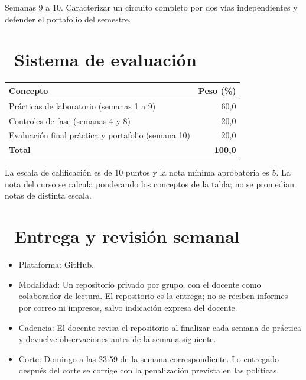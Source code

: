 \documentclass[11pt,a4paper]{article}
\newcommand{\iconotexto}[2]{\textcolor{cyanNeon}{\faIcon{#1}}~#2}
\begin{document}
\begin{tcolorbox}[cajaContenido,title={Fase 3 --- Integración y cierre}]Semanas 9 a 10. Caracterizar un circuito completo por dos vías independientes y defender el portafolio del semestre.
\end{tcolorbox}

\section{\iconotexto{clipboard-check}{Sistema de evaluación}}

\begin{tabularx}{\linewidth}{@{}X r@{}}
\toprule
Concepto & Peso (\%)\\
\midrule
Prácticas de laboratorio (semanas 1 a 9) & 60,0 \\
Controles de fase (semanas 4 y 8) & 20,0 \\
Evaluación final práctica y portafolio (semana 10) & 20,0 \\
\midrule
\textbf{Total} & \textbf{100,0}\\
\bottomrule
\end{tabularx}

\begin{cajaRecuerda}La escala de calificación es de 10 puntos y la nota mínima aprobatoria es 5. La nota del curso se calcula ponderando los conceptos de la tabla; no se promedian notas de distinta escala.
\end{cajaRecuerda}

\section{\iconotexto{code-branch}{Entrega y revisión semanal}}

\begin{itemize}[leftmargin=1.4em,itemsep=2pt,topsep=3pt]
  \item Plataforma: GitHub.
  \item Modalidad: Un repositorio privado por grupo, con el docente como colaborador de lectura. El repositorio es la entrega; no se reciben informes por correo ni impresos, salvo indicación expresa del docente.
  \item Cadencia: El docente revisa el repositorio al finalizar cada semana de práctica y devuelve observaciones antes de la semana siguiente.
  \item Corte: Domingo a las 23:59 de la semana correspondiente. Lo entregado después del corte se corrige con la penalización prevista en las políticas.
\end{itemize}
\end{document}
